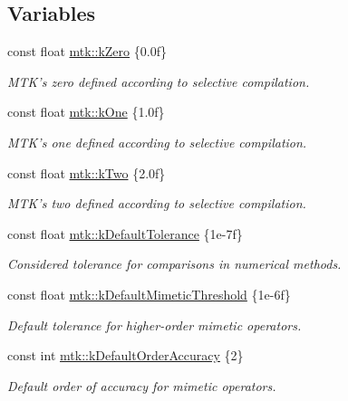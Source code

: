 \subsection*{Variables}
\begin{DoxyCompactItemize}
\item 
const float \hyperlink{group__c01-roots_ga59a451a5fae30d59649bcda274fea271}{mtk\+::k\+Zero} \{0.\+0f\}
\begin{DoxyCompactList}\small\item\em M\+T\+K's zero defined according to selective compilation. \end{DoxyCompactList}\item 
const float \hyperlink{group__c01-roots_ga26407c24d43b6b95480943340d285c71}{mtk\+::k\+One} \{1.\+0f\}
\begin{DoxyCompactList}\small\item\em M\+T\+K's one defined according to selective compilation. \end{DoxyCompactList}\item 
const float \hyperlink{group__c01-roots_gaf39c2d851a2db744f4feb1c5ab3ec2cf}{mtk\+::k\+Two} \{2.\+0f\}
\begin{DoxyCompactList}\small\item\em M\+T\+K's two defined according to selective compilation. \end{DoxyCompactList}\item 
const float \hyperlink{group__c01-roots_gae914b125d81d1b97e0aee7bbc7739786}{mtk\+::k\+Default\+Tolerance} \{1e-\/7f\}
\begin{DoxyCompactList}\small\item\em Considered tolerance for comparisons in numerical methods. \end{DoxyCompactList}\item 
const float \hyperlink{group__c01-roots_ga35718d949bdc81a08a9cc8ebbe3478a2}{mtk\+::k\+Default\+Mimetic\+Threshold} \{1e-\/6f\}
\begin{DoxyCompactList}\small\item\em Default tolerance for higher-\/order mimetic operators. \end{DoxyCompactList}\item 
const int \hyperlink{group__c01-roots_ga0d95560098eb36420511103637b6952f}{mtk\+::k\+Default\+Order\+Accuracy} \{2\}
\begin{DoxyCompactList}\small\item\em Default order of accuracy for mimetic operators. \end{DoxyCompactList}\item 

\end{DoxyCompactItemize}
